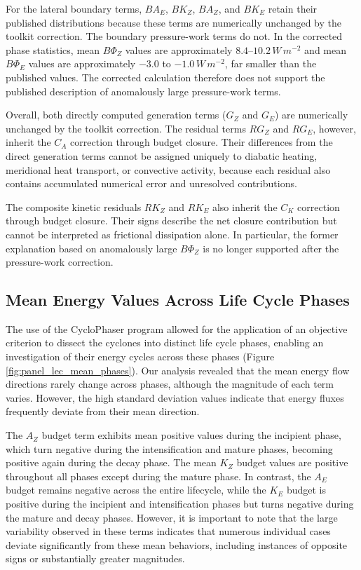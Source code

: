 \documentclass[pdflatex,sn-chicago]{sn-jnl}%
\theoremstyle{plain}
\theoremstyle{definition}
\theoremstyle{remark}
\theoremstyle{definition}
\begin{document}
For the lateral boundary terms, $BA_E$, $BK_Z$, $BA_Z$, and $BK_E$ retain their published distributions because these terms are numerically unchanged by the toolkit correction. The boundary pressure-work terms do not. In the corrected phase statistics, mean $B\Phi_Z$ values are approximately $8.4$--$10.2\,W\,m^{-2}$ and mean $B\Phi_E$ values are approximately $-3.0$ to $-1.0\,W\,m^{-2}$, far smaller than the published values. The corrected calculation therefore does not support the published description of anomalously large pressure-work terms.

Overall, both directly computed generation terms ($G_Z$ and $G_E$) are numerically unchanged by the toolkit correction. The residual terms $RG_Z$ and $RG_E$, however, inherit the $C_A$ correction through budget closure. Their differences from the direct generation terms cannot be assigned uniquely to diabatic heating, meridional heat transport, or convective activity, because each residual also contains accumulated numerical error and unresolved contributions.

The composite kinetic residuals $RK_Z$ and $RK_E$ also inherit the $C_K$ correction through budget closure. Their signs describe the net closure contribution but cannot be interpreted as frictional dissipation alone. In particular, the former explanation based on anomalously large $B\Phi_Z$ is no longer supported after the pressure-work correction.

\subsection{Mean Energy Values Across Life Cycle Phases}\label{sec:mean}

The use of the CycloPhaser program allowed for the application of an objective criterion to dissect the cyclones into distinct life cycle phases, enabling an investigation of their energy cycles across these phases (Figure \ref{fig:panel_lec_mean_phases}). Our analysis revealed that the mean energy flow directions rarely change across phases, although the magnitude of each term varies. However, the high standard deviation values indicate that energy fluxes frequently deviate from their mean direction.

The $A_Z$ budget term exhibits mean positive values during the incipient phase, which turn negative during the intensification and mature phases, becoming positive again during the decay phase. The mean $K_Z$ budget values are positive throughout all phases except during the mature phase. In contrast, the $A_E$ budget remains negative across the entire lifecycle, while the $K_E$ budget is positive during the incipient and intensification phases but turns negative during the mature and decay phases. However, it is important to note that the large variability observed in these terms indicates that numerous individual cases deviate significantly from these mean behaviors, including instances of opposite signs or substantially greater magnitudes.
\end{document}
